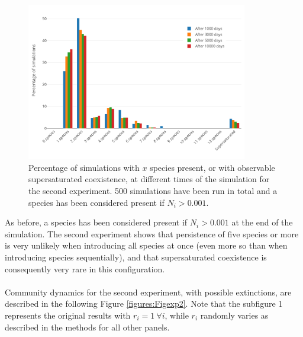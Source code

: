 \begin{figure}[H]
	\begin{center} 
		\includegraphics[width=0.86\textwidth]{../Code/Figures/Figure_exp2_bar.pdf}
 		\caption{Percentage of simulations with $x$ species present, or with observable supersaturated coexistence, at different times of the simulation for the second experiment. 500 simulations have been run in total and a species has been considered present if $N_i > 0.001$.}
 		\label{figures:Figexp2bar}
	\end{center}
\end{figure}

As before, a species has been considered present if $N_i > 0.001$ at the end of the simulation. The second experiment shows that persistence of five species or more is very unlikely when introducing all species at once (even more so than when introducing species sequentially), and that supersaturated coexistence is consequently very rare in this configuration.\\
\\
Community dynamics for the second experiment, with possible extinctions, are described in the following Figure \ref{figures:Figexp2}. Note that the subfigure 1 represents the original results with $r_i=1 ~\forall i$, while $r_i$ randomly varies as described in the methods for all other panels.

